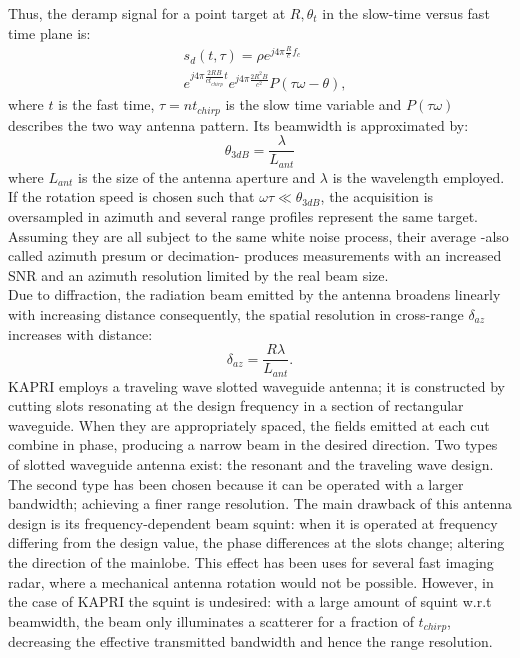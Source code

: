 Thus, the deramp signal for a point target at $R, \theta_{t}$ in the slow-time versus fast time plane is:
\begin{equation}\label{eq:signal_model}
	\begin{aligned}
	& s_{d}\left(t,\tau\right) = \rho e^{j 4 \pi \frac{ R}{c}f_c}   \\
	& e^{j 4 \pi \frac{2 R B }{c t_{chirp}} t}  e^{j 4 \pi \frac{2 R^2 B}{c^2}} P\left(\tau \omega - \theta\right),
	\end{aligned}
\end{equation} 
where $t$ is the fast time, $\tau = n t_{chirp}$ is the slow time variable and $P\left(\tau \omega\right)$ describes the two way antenna pattern. Its beamwidth is approximated by:
\begin{equation}\label{eq:azimuth_resolution}
	\theta_{3dB} = \frac{\lambda}{L_{ant}}
\end{equation}
where $L_{ant}$ is the size of the antenna aperture and $\lambda$ is the wavelength employed.
If the rotation speed is chosen such that $\omega \tau \ll \theta_{3dB}$, the acquisition is oversampled in azimuth and several range profiles represent the same target. Assuming they are all subject to the same white noise process, their average -also called azimuth presum or decimation- produces measurements with an increased SNR and an azimuth resolution limited by the real beam size.\\ 
Due to diffraction, the radiation beam emitted by the antenna broadens linearly with increasing distance consequently, the spatial resolution in cross-range $\delta_{az}$ increases with distance:
\begin{equation}\label{eq:azimuth_ground_resolution}
	\delta_{az} = \frac{R \lambda}{L_{ant}}.
\end{equation}
KAPRI employs a traveling wave slotted waveguide antenna\cite{Hines1953a,Granet2007}; it is constructed by cutting slots resonating at the design frequency in a section of rectangular waveguide. When they are appropriately spaced, the fields emitted at each cut combine in phase, producing a narrow beam in the desired direction. Two types of slotted waveguide antenna exist\cite{Enjiu2013}: the resonant and the traveling wave design. The second type has been chosen because it can be operated with a larger bandwidth; achieving a finer range resolution. The main drawback of this antenna design is its frequency-dependent beam squint: when it is operated at frequency differing from the design value, the phase differences at the slots change; altering the direction of the mainlobe. This effect has been uses for several fast imaging radar, where a mechanical antenna rotation would not be possible\cite{Yang2014,Yang2012,Mayer2003,Alvarez2013}. However, in the case of KAPRI the squint is undesired: with a large amount of squint w.r.t beamwidth, the beam only illuminates a scatterer for a fraction of $t_{chirp}$, decreasing the effective transmitted bandwidth and hence the range resolution. \\ 
